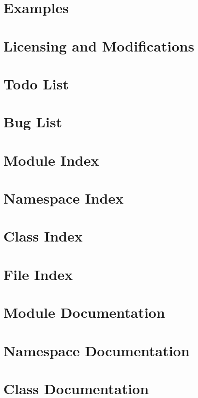 \documentclass[twoside]{book}
\newcommand{\+}{\discretionary{\mbox{\scriptsize$\hookleftarrow$}}{}{}}
\begin{document}
\chapter{Examples}
\label{page_examples}
\hypertarget{page_examples}{}

\chapter{Licensing and Modifications}
\label{section_license_mod}
\hypertarget{section_license_mod}{}

\chapter{Todo List}
\label{todo}
\hypertarget{todo}{}

\chapter{Bug List}
\label{bug}
\hypertarget{bug}{}

\chapter{Module Index}

\chapter{Namespace Index}

\chapter{Class Index}

\chapter{File Index}

\chapter{Module Documentation}







\chapter{Namespace Documentation}

\chapter{Class Documentation}


























\end{document}
